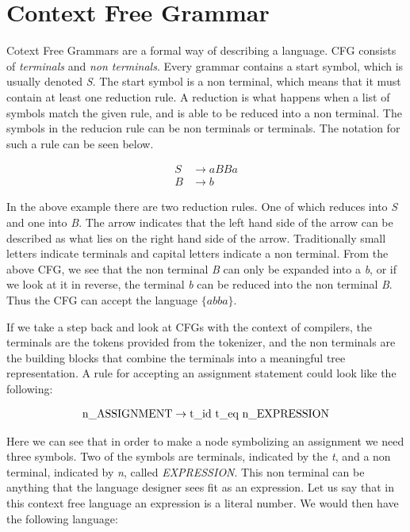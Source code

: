 \section*{Context Free Grammar}

Cotext Free Grammars are a formal way of describing a language. 
CFG consists of \textit{terminals} and \textit{non terminals}. Every grammar contains a start symbol, which is usually denoted \textit{S}. The start symbol is a non terminal, which means that it must contain at least one reduction rule. A reduction is what happens when a list of symbols match the given rule, and is able to be reduced into a non terminal. The symbols in the reducion rule can be non terminals or terminals. The notation for such a rule can be seen below.


\begin{equation*}
  \begin{split}
      S &\rightarrow aBBa \\
      B &\rightarrow b
  \end{split}
\end{equation*}

In the above example there are two reduction rules. One of which reduces into \textit{S} and one into \textit{B}. The arrow indicates that the left hand side of the arrow can be described as what lies on the right hand side of the arrow. Traditionally small letters indicate terminals and capital letters indicate a non terminal. From the above CFG, we see that the non terminal \textit{B} can only be expanded into a \textit{b}, or if we look at it in reverse, the terminal \textit{b} can be reduced into the non terminal \textit{B}. Thus the CFG can accept the language $\{abba\}$.

If we take a step back and look at CFGs with the context of compilers, the terminals are the tokens provided from the tokenizer, and the non terminals are the building blocks that combine the terminals into a meaningful tree representation. A rule for accepting an assignment statement could look like the following:

\begin{equation*}
  \begin{split}
      \text{\text{n\textunderscore ASSIGNMENT}} &\rightarrow \text{\text{t\textunderscore id}   \text{t\textunderscore eq}   \text{n\textunderscore EXPRESSION}} \\
  \end{split}
\end{equation*}

Here we can see that in order to make a node symbolizing an assignment we need three symbols. Two of the symbols are terminals, indicated by the \textit{t}, and a non terminal, indicated by \textit{n}, called \textit{EXPRESSION}. This non terminal can be anything that the language designer sees fit as an expression. Let us say that in this context free language an expression is a literal number. We would then have the following language:

